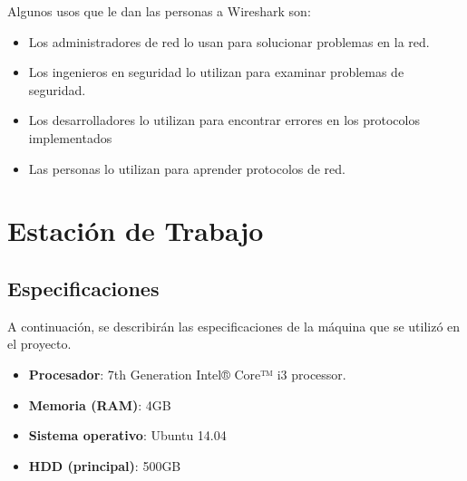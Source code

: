 Algunos usos que le dan las personas a Wireshark son:

\begin{itemize}
\item Los administradores de red lo usan para solucionar problemas en la red.
\item Los ingenieros en seguridad lo utilizan para examinar problemas de seguridad.
\item Los desarrolladores lo utilizan para encontrar errores en los protocolos implementados
\item Las personas lo utilizan para aprender protocolos de red.
\end{itemize}

\section{Estación de Trabajo}

\subsection{Especificaciones}
A continuación, se describirán las especificaciones de la máquina que se utilizó en el proyecto.

\begin{itemize}
\item \textbf{Procesador}: 7th Generation Intel® Core™ i3 processor.
\item \textbf{Memoria (RAM)}: 4GB
\item \textbf{Sistema operativo}: Ubuntu 14.04
\item \textbf{HDD (principal)}: 500GB
\end{itemize}
